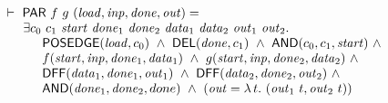 \documentclass{llncs}
\begin{document}
\begin{footnotesize}
\smallskip

$
\begin{array}{l}
\TURNST\ \DEF{PAR}\ f\ g\ (\VAR{load,inp,done,out}) = \\
\phantom{\TURNST\ ~}     \exists c_0~c_1~\VAR{start}~\sVAR{done}{1}~\sVAR{done}{2}~
                                 \sVAR{data}{1}~\sVAR{data}{2}~\sVAR{out}{1}~\sVAR{out}{2}.\\
\phantom{\TURNST\ ~~ \exists~}
       \DEF{POSEDGE} (\VAR{load},c_0)\ \AND\  
       \DEF{DEL} (\VAR{done},c_1)\ \AND \ 
       \DEF{AND} (c_0,c_1,\VAR{start})\ \AND\\
\phantom{\TURNST\ ~~ \exists~}
       f (\VAR{start},\VAR{inp},\sVAR{done}{1},\sVAR{data}{1})\ \AND \ 
       g (\VAR{start},\VAR{inp},\sVAR{done}{2},\sVAR{data}{2})\ \AND\\
\phantom{\TURNST\ ~~ \exists~}
       \DEF{DFF} (\sVAR{data}{1},\sVAR{done}{1},\sVAR{out}{1})\ \AND \  
       \DEF{DFF} (\sVAR{data}{2},\sVAR{done}{2},\sVAR{out}{2})\ \AND\\
\phantom{\TURNST\ ~~ \exists~}
       \DEF{AND} (\sVAR{done}{1},\sVAR{done}{2},done)\ \AND \ 
       (\VAR{out} = \LAMBDA{t}{(\sVAR{out}{1}\ t,\sVAR{out}{2}\ t)})
\end{array}
$

\smallskip


\end{footnotesize}
\end{document}
